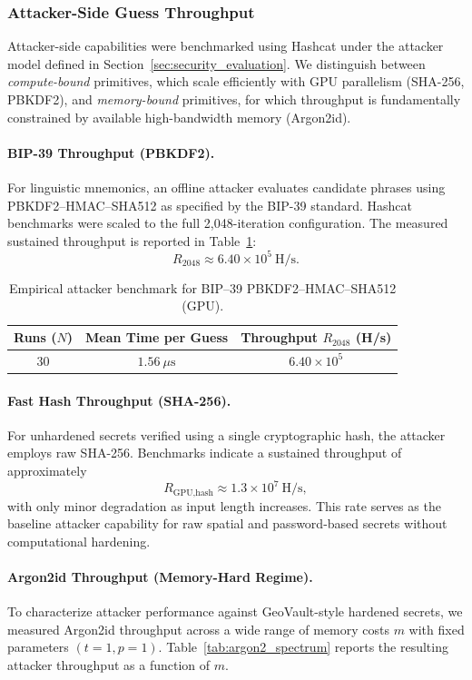 \documentclass[journal,article,accept,pdftex,moreauthors]{Definitions/mdpi}
\begin{document}
\subsubsection{Attacker-Side Guess Throughput}
\label{sec:attacker_performance}

Attacker-side capabilities were benchmarked using Hashcat under the attacker model defined in Section~\ref{sec:security_evaluation}. We distinguish between \emph{compute-bound} primitives, which scale efficiently with GPU parallelism (SHA-256, PBKDF2), and \emph{memory-bound} primitives, for which throughput is fundamentally constrained by available high-bandwidth memory (Argon2id).

\paragraph{BIP-39 Throughput (PBKDF2).}
For linguistic mnemonics, an offline attacker evaluates candidate phrases using PBKDF2--HMAC--SHA512 as specified by the BIP-39 standard. Hashcat benchmarks were scaled to the full 2{,}048-iteration configuration. The measured sustained throughput is reported in Table~\ref{tab:attacker_cost}:
\[
R_{2048} \approx 6.40 \times 10^{5} \ \text{H/s}.
\]

\begin{table}[H]
\caption{Empirical attacker benchmark for BIP--39 PBKDF2--HMAC--SHA512 (GPU).}
\label{tab:attacker_cost}
\centering
\begin{tabular}{ccc}
\toprule
\textbf{Runs ($N$)} & \textbf{Mean Time per Guess} & \textbf{Throughput $R_{2048}$ (H/s)} \\
\midrule
30 & $1.56~\mu\mathrm{s}$ & $6.40 \times 10^{5}$ \\
\bottomrule
\end{tabular}
\end{table}

\paragraph{Fast Hash Throughput (SHA-256).}
For unhardened secrets verified using a single cryptographic hash, the attacker employs raw SHA-256. Benchmarks indicate a sustained throughput of approximately
\[
R_{\text{GPU,hash}} \approx 1.3 \times 10^{7} \ \text{H/s},
\]
with only minor degradation as input length increases. This rate serves as the baseline attacker capability for raw spatial and password-based secrets without computational hardening.

\paragraph{Argon2id Throughput (Memory-Hard Regime).}
To characterize attacker performance against GeoVault-style hardened secrets, we measured Argon2id throughput across a wide range of memory costs $m$ with fixed parameters $(t=1, p=1)$. Table~\ref{tab:argon2_spectrum} reports the resulting attacker throughput as a function of $m$.
\end{document}
